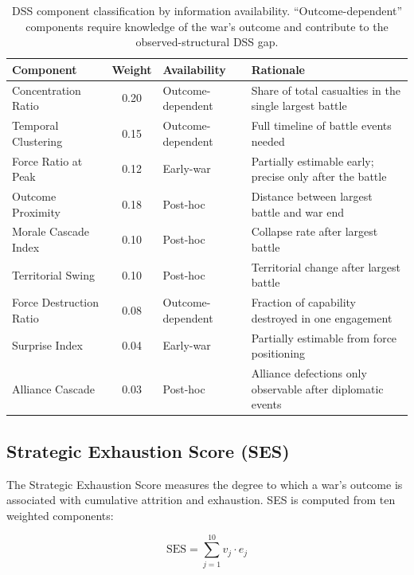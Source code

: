 \begin{table}[H]
\centering
\caption{DSS component classification by information availability. ``Outcome-dependent'' components require knowledge of the war's outcome and contribute to the observed-structural DSS gap.}
\label{tab:component_availability}
\small
\setlength{\tabcolsep}{2pt}
\renewcommand{\arraystretch}{1.05}
\begin{tabularx}{\textwidth}{l c l X}
\toprule
\textbf{Component} & \textbf{Weight} & \textbf{Availability} & \textbf{Rationale} \\
\midrule
Concentration Ratio & 0.20 & Outcome-dependent & Share of total casualties in the single largest battle \\
Temporal Clustering & 0.15 & Outcome-dependent & Full timeline of battle events needed \\
Force Ratio at Peak & 0.12 & Early-war & Partially estimable early; precise only after the battle \\
Outcome Proximity & 0.18 & Post-hoc & Distance between largest battle and war end \\
Morale Cascade Index & 0.10 & Post-hoc & Collapse rate after largest battle \\
Territorial Swing & 0.10 & Post-hoc & Territorial change after largest battle \\
Force Destruction Ratio & 0.08 & Outcome-dependent & Fraction of capability destroyed in one engagement \\
Surprise Index & 0.04 & Early-war & Partially estimable from force positioning \\
Alliance Cascade & 0.03 & Post-hoc & Alliance defections only observable after diplomatic events \\
\bottomrule
\end{tabularx}
\end{table}

\subsection{Strategic Exhaustion Score (SES)}

The Strategic Exhaustion Score measures the degree to which a war's outcome is associated with cumulative attrition and exhaustion. SES is computed from ten weighted components:

\begin{equation}
\text{SES} = \sum_{j=1}^{10} v_j \cdot e_j
\label{eq:ses}
\end{equation}

